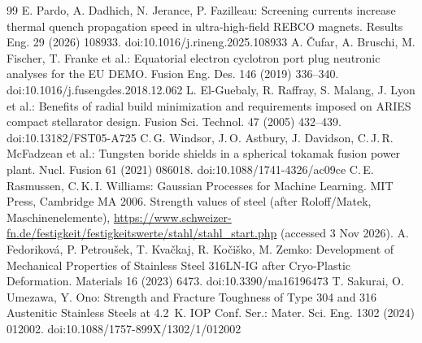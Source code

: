 \documentclass[10pt,a4paper]{article}
\begin{document}
\begin{thebibliography}{99}
 E. Pardo, A. Dadhich, N. Jerance, P. Fazilleau: Screening currents increase thermal quench propagation speed in ultra-high-field REBCO magnets. Results Eng. 29 (2026) 108933. doi:10.1016/j.rineng.2025.108933
 A. Čufar, A. Bruschi, M. Fischer, T. Franke et al.: Equatorial electron cyclotron port plug neutronic analyses for the EU DEMO. Fusion Eng. Des. 146 (2019) 336--340. doi:10.1016/j.fusengdes.2018.12.062
 L. El-Guebaly, R. Raffray, S. Malang, J. Lyon et al.: Benefits of radial build minimization and requirements imposed on ARIES compact stellarator design. Fusion Sci. Technol. 47 (2005) 432--439. doi:10.13182/FST05-A725
 C.\,G. Windsor, J.\,O. Astbury, J. Davidson, C.\,J.\,R. McFadzean et al.: Tungsten boride shields in a spherical tokamak fusion power plant. Nucl. Fusion 61 (2021) 086018. doi:10.1088/1741-4326/ac09ce
 C.\,E. Rasmussen, C.\,K.\,I. Williams: Gaussian Processes for Machine Learning. MIT Press, Cambridge MA 2006.
 Strength values of steel (after Roloff/Matek, Maschinenelemente), \url{https://www.schweizer-fn.de/festigkeit/festigkeitswerte/stahl/stahl_start.php} (accessed 3 Nov 2026).
 A. Fedoriková, P. Petroušek, T. Kvačkaj, R. Kočiško, M. Zemko: Development of Mechanical Properties of Stainless Steel 316LN-IG after Cryo-Plastic Deformation. Materials 16 (2023) 6473. doi:10.3390/ma16196473
 T. Sakurai, O. Umezawa, Y. Ono: Strength and Fracture Toughness of Type 304 and 316 Austenitic Stainless Steels at 4.2~K. IOP Conf. Ser.: Mater. Sci. Eng. 1302 (2024) 012002. doi:10.1088/1757-899X/1302/1/012002
\end{thebibliography}
\end{document}
